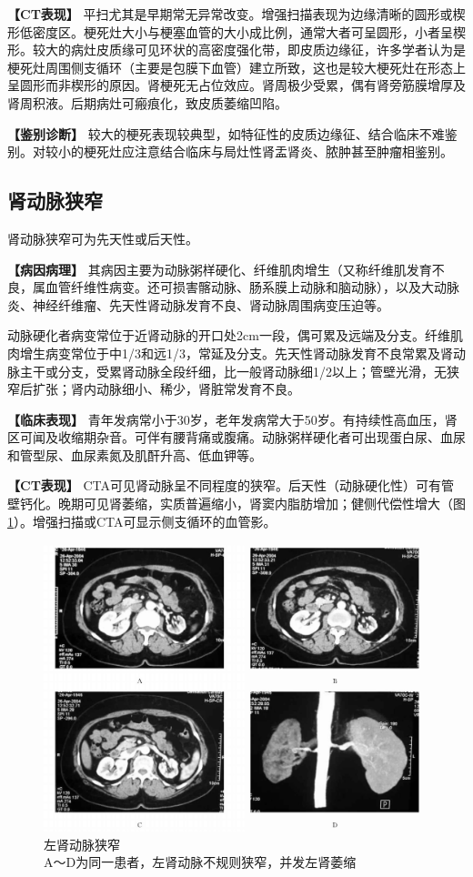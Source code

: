 \textbf{【CT表现】}
平扫尤其是早期常无异常改变。增强扫描表现为边缘清晰的圆形或楔形低密度区。梗死灶大小与梗塞血管的大小成比例，通常大者可呈圆形，小者呈楔形。较大的病灶皮质缘可见环状的高密度强化带，即皮质边缘征，许多学者认为是梗死灶周围侧支循环（主要是包膜下血管）建立所致，这也是较大梗死灶在形态上呈圆形而非楔形的原因。肾梗死无占位效应。肾周极少受累，偶有肾旁筋膜增厚及肾周积液。后期病灶可瘢痕化，致皮质萎缩凹陷。

\textbf{【鉴别诊断】}
较大的梗死表现较典型，如特征性的皮质边缘征、结合临床不难鉴别。对较小的梗死灶应注意结合临床与局灶性肾盂肾炎、脓肿甚至肿瘤相鉴别。

\subsection{肾动脉狭窄}

肾动脉狭窄可为先天性或后天性。

\textbf{【病因病理】}
其病因主要为动脉粥样硬化、纤维肌肉增生（又称纤维肌发育不良，属血管纤维性病变。还可损害髂动脉、肠系膜上动脉和脑动脉），以及大动脉炎、神经纤维瘤、先天性肾动脉发育不良、肾动脉周围病变压迫等。

动脉硬化者病变常位于近肾动脉的开口处2cm一段，偶可累及远端及分支。纤维肌肉增生病变常位于中1/3和远1/3，常延及分支。先天性肾动脉发育不良常累及肾动脉主干或分支，受累肾动脉全段纤细，比一般肾动脉细1/2以上；管壁光滑，无狭窄后扩张；肾内动脉细小、稀少，肾脏常发育不良。

\textbf{【临床表现】}
青年发病常小于30岁，老年发病常大于50岁。有持续性高血压，肾区可闻及收缩期杂音。可伴有腰背痛或腹痛。动脉粥样硬化者可出现蛋白尿、血尿和管型尿、血尿素氮及肌酐升高、低血钾等。

\textbf{【CT表现】}
CTA可见肾动脉呈不同程度的狭窄。后天性（动脉硬化性）可有管壁钙化。晚期可见肾萎缩，实质普遍缩小，肾窦内脂肪增加；健侧代偿性增大（图\ref{fig15-27}）。增强扫描或CTA可显示侧支循环的血管影。

\begin{figure}[!htbp]
 \centering
 \includegraphics[width=.7\textwidth,height=\textheight,keepaspectratio]{./images/Image00344.jpg}
 \captionsetup{justification=centering}
 \caption{左肾动脉狭窄\\{\small A～D为同一患者，左肾动脉不规则狭窄，并发左肾萎缩}}
 \label{fig15-27}
  \end{figure} 

